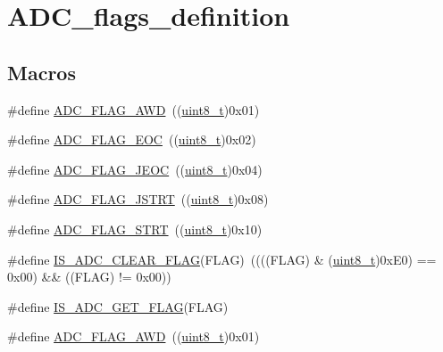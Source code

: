 \hypertarget{group___a_d_c__flags__definition}{}\section{A\+D\+C\+\_\+flags\+\_\+definition}
\label{group___a_d_c__flags__definition}
\subsection*{Macros}
\begin{DoxyCompactItemize}
\item 
\#define \hyperlink{group___a_d_c__flags__definition_gadb75a4b430fb84950232b7a8f3a6a877}{A\+D\+C\+\_\+\+F\+L\+A\+G\+\_\+\+A\+WD}~((\hyperlink{_p_e___types_8h_aba7bc1797add20fe3efdf37ced1182c5}{uint8\+\_\+t})0x01)
\item 
\#define \hyperlink{group___a_d_c__flags__definition_gaf2c6fdf7e9ab63b778149e5fb56413d4}{A\+D\+C\+\_\+\+F\+L\+A\+G\+\_\+\+E\+OC}~((\hyperlink{_p_e___types_8h_aba7bc1797add20fe3efdf37ced1182c5}{uint8\+\_\+t})0x02)
\item 
\#define \hyperlink{group___a_d_c__flags__definition_ga4df8eea8ab83d98104ee15a339743a4e}{A\+D\+C\+\_\+\+F\+L\+A\+G\+\_\+\+J\+E\+OC}~((\hyperlink{_p_e___types_8h_aba7bc1797add20fe3efdf37ced1182c5}{uint8\+\_\+t})0x04)
\item 
\#define \hyperlink{group___a_d_c__flags__definition_ga278f4e866f4322c1120bf0db5301c432}{A\+D\+C\+\_\+\+F\+L\+A\+G\+\_\+\+J\+S\+T\+RT}~((\hyperlink{_p_e___types_8h_aba7bc1797add20fe3efdf37ced1182c5}{uint8\+\_\+t})0x08)
\item 
\#define \hyperlink{group___a_d_c__flags__definition_gad0c59ae7749c69b5b91f2c533db1b619}{A\+D\+C\+\_\+\+F\+L\+A\+G\+\_\+\+S\+T\+RT}~((\hyperlink{_p_e___types_8h_aba7bc1797add20fe3efdf37ced1182c5}{uint8\+\_\+t})0x10)
\item 
\#define \hyperlink{group___a_d_c__flags__definition_gac5b6fb60ec921255b05261ec04573470}{I\+S\+\_\+\+A\+D\+C\+\_\+\+C\+L\+E\+A\+R\+\_\+\+F\+L\+AG}(F\+L\+AG)~((((F\+L\+AG) \& (\hyperlink{_p_e___types_8h_aba7bc1797add20fe3efdf37ced1182c5}{uint8\+\_\+t})0x\+E0) == 0x00) \&\& ((\+F\+L\+A\+G) != 0x00))
\item 
\#define \hyperlink{group___a_d_c__flags__definition_ga597eb68dfef9dbe0928ed14a1aedc710}{I\+S\+\_\+\+A\+D\+C\+\_\+\+G\+E\+T\+\_\+\+F\+L\+AG}(F\+L\+AG)
\item 
\#define \hyperlink{group___a_d_c__flags__definition_gadb75a4b430fb84950232b7a8f3a6a877}{A\+D\+C\+\_\+\+F\+L\+A\+G\+\_\+\+A\+WD}~((\hyperlink{_p_e___types_8h_aba7bc1797add20fe3efdf37ced1182c5}{uint8\+\_\+t})0x01)

\end{DoxyCompactItemize}
